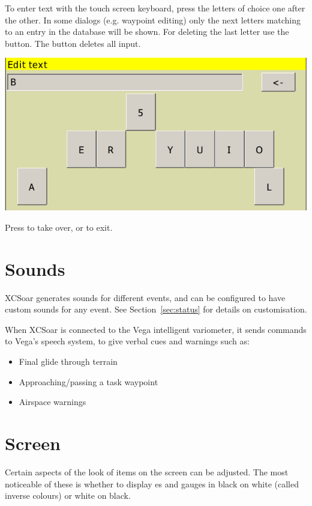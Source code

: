 \documentclass[a4paper,12pt]{refrep}
\begin{document}
To enter text with the touch screen keyboard, press the letters of choice one after the other. 
In some dialogs (e.g. waypoint editing) only the next letters matching to an entry in the database 
will be shown. For deleting the last letter use the \button{$<-$} button. The
 button deletes all input.

\begin{center}
\includegraphics[angle=0,width=\linewidth,keepaspectratio='true']{figures/textentry_keyboard.png}
\end{center}

Press  to take over, or  to exit.

\section{Sounds}

XCSoar generates sounds for different events, and can be configured to
have custom sounds for any event.  See Section~\ref{sec:status} for
details on customisation.

When XCSoar is connected to the Vega intelligent variometer, it sends
commands to Vega's speech system, to give verbal cues and warnings such as:
\begin{itemize}
\item Final glide through terrain
\item Approaching/passing a task waypoint
\item Airspace warnings
\end{itemize}

\section{Screen}

Certain aspects of the look of items on the screen can be adjusted.
The most noticeable of these is whether to display {\InfoBox}es and
gauges in black on white (called inverse colours) or white on black.
\end{document}
